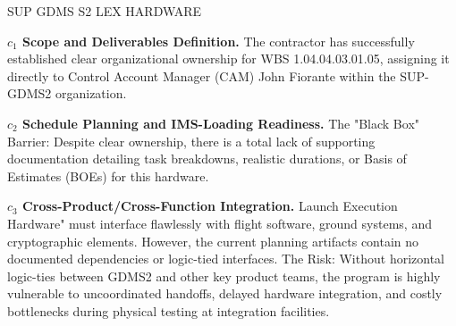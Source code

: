 %
\begin{frame}{SUP GDMS S2 LEX HARDWARE}
\begin{minipage}{0.90\textwidth}
\raggedright
\fontsize{8}{9.5}\selectfont
\textbf{\(c_1\) Scope and Deliverables Definition.}
The contractor has successfully established clear organizational ownership for WBS 1.04.04.03.01.05, assigning it directly to Control Account Manager (CAM) John Fiorante within the SUP-GDMS2 organization.\par\vspace{0.6em}
\textbf{\(c_2\) Schedule Planning and IMS-Loading Readiness.}
The "Black Box" Barrier: Despite clear ownership, there is a total lack of supporting documentation detailing task breakdowns, realistic durations, or Basis of Estimates (BOEs) for this hardware.\par\vspace{0.6em}
\textbf{\(c_3\) Cross-Product/Cross-Function Integration.}
Launch Execution Hardware" must interface flawlessly with flight software, ground systems, and cryptographic elements. However, the current planning artifacts contain no documented dependencies or logic-tied interfaces. The Risk: Without horizontal logic-ties between GDMS2 and other key product teams, the program is highly vulnerable to uncoordinated handoffs, delayed hardware integration, and costly bottlenecks during physical testing at integration facilities.\par\vspace{0.6em}
\end{minipage}
\end{frame}

\endinput
